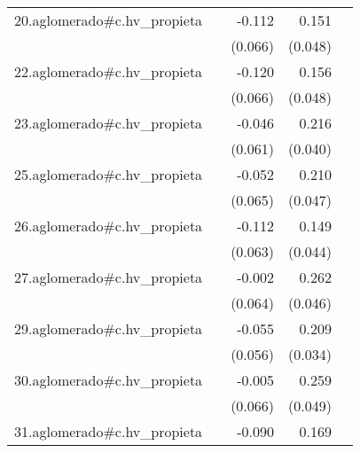 {\begin{longtable}{l*{4}{D{.}{.}{-1}}}
\addlinespace
20.aglomerado#c.hv\_propieta&                     &      -0.112         &       0.151\sym{**} &                     \\
            &                     &     (0.066)         &     (0.048)         &                     \\
\addlinespace
22.aglomerado#c.hv\_propieta&                     &      -0.120         &       0.156\sym{**} &                     \\
            &                     &     (0.066)         &     (0.048)         &                     \\
\addlinespace
23.aglomerado#c.hv\_propieta&                     &      -0.046         &       0.216\sym{***}&                     \\
            &                     &     (0.061)         &     (0.040)         &                     \\
\addlinespace
25.aglomerado#c.hv\_propieta&                     &      -0.052         &       0.210\sym{***}&                     \\
            &                     &     (0.065)         &     (0.047)         &                     \\
\addlinespace
26.aglomerado#c.hv\_propieta&                     &      -0.112         &       0.149\sym{***}&                     \\
            &                     &     (0.063)         &     (0.044)         &                     \\
\addlinespace
27.aglomerado#c.hv\_propieta&                     &      -0.002         &       0.262\sym{***}&                     \\
            &                     &     (0.064)         &     (0.046)         &                     \\
\addlinespace
29.aglomerado#c.hv\_propieta&                     &      -0.055         &       0.209\sym{***}&                     \\
            &                     &     (0.056)         &     (0.034)         &                     \\
\addlinespace
30.aglomerado#c.hv\_propieta&                     &      -0.005         &       0.259\sym{***}&                     \\
            &                     &     (0.066)         &     (0.049)         &                     \\
\addlinespace
31.aglomerado#c.hv\_propieta&                     &      -0.090         &       0.169\sym{***}&                     \\

\end{longtable}}
